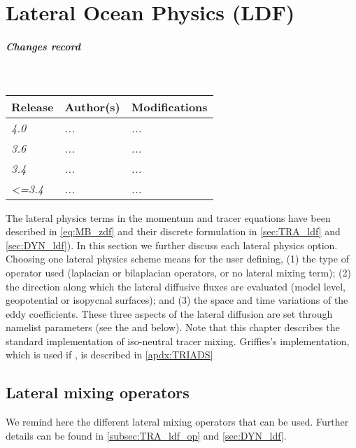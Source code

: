 \documentclass[../main/NEMO_manual]{subfiles}
\begin{document}
\chapter{Lateral Ocean Physics (LDF)}
\label{chap:LDF}

\chaptertoc

\paragraph{Changes record} ~\\

{\footnotesize
  \begin{tabularx}{\textwidth}{l||X|X}
    Release & Author(s) & Modifications \\
    \hline
    {\em   4.0} & {\em ...} & {\em ...} \\
    {\em   3.6} & {\em ...} & {\em ...} \\
    {\em   3.4} & {\em ...} & {\em ...} \\
    {\em <=3.4} & {\em ...} & {\em ...}
  \end{tabularx}
}

\clearpage

The lateral physics terms in the momentum and tracer equations have been described in \autoref{eq:MB_zdf} and
their discrete formulation in \autoref{sec:TRA_ldf} and \autoref{sec:DYN_ldf}).
In this section we further discuss each lateral physics option.
Choosing one lateral physics scheme means for the user defining,
(1) the type of operator used (laplacian or bilaplacian operators, or no lateral mixing term);
(2) the direction along which the lateral diffusive fluxes are evaluated
(model level, geopotential or isopycnal surfaces); and
(3) the space and time variations of the eddy coefficients.
These three aspects of the lateral diffusion are set through namelist parameters
(see the  and  below).
Note that this chapter describes the standard implementation of iso-neutral tracer mixing.
Griffies's implementation, which is used if ,
is described in \autoref{apdx:TRIADS}

\section[Lateral mixing operators]{Lateral mixing operators}
\label{sec:LDF_op}
We remind here the different lateral mixing operators that can be used. Further details can be found in \autoref{subsec:TRA_ldf_op} and  \autoref{sec:DYN_ldf}.
\end{document}
